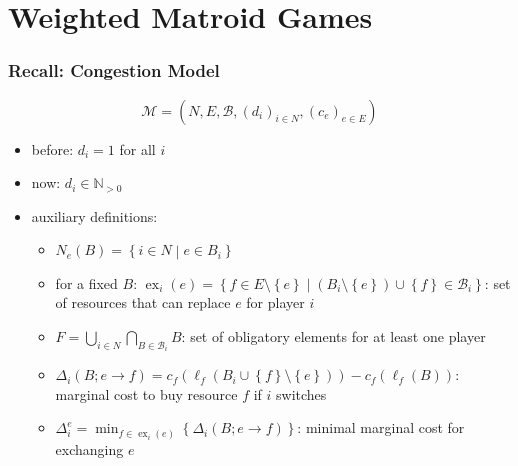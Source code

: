 \documentclass{beamer}
\newcommand{\tupel}[1]{\left(#1\right)}
\newcommand{\set}[1]{\left\{#1\right\}}
\DeclareMathOperator{\ex}{ex}
\begin{document}
\section{Weighted Matroid Games}
\begin{frame}
  \frametitle{Recall: Congestion Model}
  \begin{equation*}
    \mathcal{M} = \tupel{N, E, \mathcal{B}, \left(d_{i}\right)_{i\in N},
    \left(c_{e}\right)_{e\in E}}
  \end{equation*}
  \vspace{-1cm}
  \begin{itemize}
    \item before: $d_{i} = 1$ for all $i$
    \item<2-> now: $d_{i}\in\mathbb{N}_{>0}$ 
    \item<3-> auxiliary definitions:
      \begin{itemize}
        \item<4-> $N_{e}\tupel{B} = \set{i\in N\middle|e\in B_{i}}$
        \item<5-> for a fixed $B$: $\ex_{i}\tupel{e} =
          \set{f\in E\setminus\set{e}\middle|
          (B_{i}\setminus\set{e})\cup\set{f}\in\mathcal{B}_{i}}$: set of resources
          that can replace $e$ for player $i$
        \item<6-> $F = \bigcup_{i\in N}\bigcap_{B\in \mathcal{B}_{i}} B$:
          set of obligatory elements for at least one player
        \item<7-> $\Delta_{i}\tupel{B;e\rightarrow f} =
          c_{f}\tupel{\ell_{f}\tupel{B_{i}\cup\set{f}\setminus\set{e}}} -
          c_{f}\tupel{\ell_{f}\tupel{B}}$: marginal cost to buy resource $f$ if
          $i$ switches
        \item<8-> $\Delta_{i}^{e} = \min_{f\in\ex_{i}(e)}\set{\Delta_{i}(B;e\rightarrow f)}$:
          minimal marginal cost for exchanging $e$
      \end{itemize}
  \end{itemize}
\end{frame}
\end{document}

